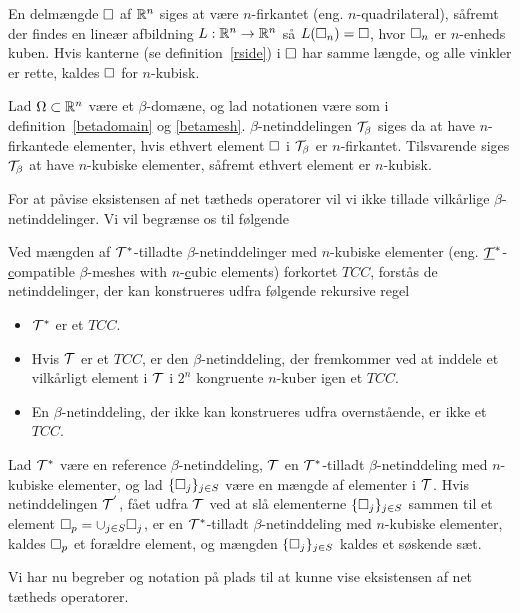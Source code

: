 \begin{definition}
En delmængde $\Box$ af $\mathbb{R}^n$ siges at være $n$-firkantet (eng.
$n$-quad\-ri\-la\-te\-ral), såfremt der findes en lineær afbildning $L:\mathbb{R}^n
\rightarrow \mathbb{R}^n$ så $L(\Box_n)=\Box$, hvor $\Box_n$ er $n$-enheds kuben.
Hvis kanterne (se definition~\ref{rside}) i $\Box$ har samme længde, og
alle vinkler er rette, kaldes $\Box$ for $n$-kubisk.
\end{definition}
\begin{definition}
Lad $\Omega\subset\mathbb{R}^n$ være et $\beta$-domæne, og lad notationen være
som i definition~\ref{betadomain} og \ref{betamesh}.
$\beta$-netinddelingen $\mathcal T_\beta$ siges da at have $n$-firkantede
ele\-menter, hvis ethvert element $\Box$ i $\mathcal T_\beta$ er
$n$-firkantet. Tilsvarende siges $\mathcal T_\beta$ at have $n$-kubiske elementer,
såfremt ethvert element er $n$-kubisk.
\end{definition}
For at påvise eksistensen af net tætheds operatorer vil vi ikke tillade
vilkårlige $\beta$-netinddelinger. Vi vil begrænse os til følgende
\begin{definition}
Ved mængden af $\mathcal T^{\ast}$-tilladte $\beta$-netinddelinger med
$n$-kubiske elementer (eng. $\underline{\mathcal T}^{\ast}$-\underline{c}ompatible 
$\beta$-meshes with $n$-\underline{c}ubic elements) forkortet $TCC$,
forstås de netinddelinger, der kan konstrueres udfra følgende rekursive regel
\begin{itemize}
  \item $\mathcal T^{\ast}$ er et $TCC$.
  \item Hvis $\mathcal T$ er et $TCC$, er den $\beta$-netinddeling, der
        fremkommer ved at inddele et vilkårligt element i $\mathcal T$ i $2^n$
        kongruente $n$-kuber igen et $TCC$.
  \item En $\beta$-netinddeling, der ikke kan konstrueres udfra
        overnstående, er ikke et $TCC$.
\end{itemize}
\end{definition}
\begin{definition}
Lad $\mathcal T^{\ast}$ være en reference $\beta$-netinddeling, $\mathcal T$ en
$\mathcal T^{\ast}$-tilladt $\beta$-netinddeling med $n$-kubiske elementer, og
lad $\{\Box_j\}_{j\in S}$ være en mængde af elementer i $\mathcal T$. Hvis
netinddelingen $\mathcal T^{'}$, fået udfra $\mathcal T$ ved at slå elementerne
$\{\Box_j\}_{j\in S}$ sammen til et element $\Box_p = \cup_{j\in S}\Box_j$, er
en $\mathcal T^{\ast}$-tilladt $\beta$-netinddeling med $n$-kubiske elementer,
kaldes $\Box_p$ et forældre element, og mængden $\{\Box_j\}_{j\in S}$
kaldes et søskende sæt.     
\end{definition}
Vi har nu begreber og notation på plads til at kunne vise eksistensen
af net tætheds operatorer. 

